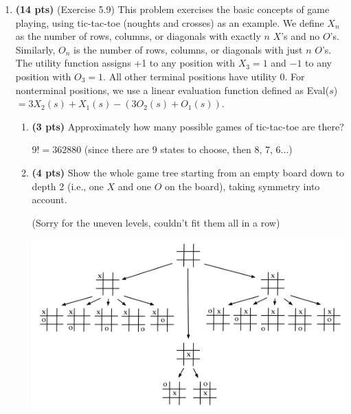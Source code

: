 \documentclass{article}
\begin{document}
\begin{enumerate}
\item \textbf{(14 pts)} (Exercise 5.9) This problem exercises the basic concepts of game playing, using tic-tac-toe (noughts and crosses) as an example. We define $X_n$ as the number of rows, columns, or diagonals with exactly $n$ $X$’s and no $O$’s. Similarly, $O_n$ is the number of rows, columns, or diagonals with just $n$ $O$’s. The utility function assigns +1 to any position with $X_3 = 1$ and $-1$ to any position with $O_3 = 1$. All other terminal positions have utility 0. For nonterminal positions, we  use a linear evaluation function defined as Eval($s$) $ = 3X_2(s) + X_1(s) - (3O_2(s) + O_1(s))$.

\begin{enumerate}[label=($\alph*$)]
    
    
    \item \textbf{(3 pts)} Approximately how many possible games of tic-tac-toe are there?

    \color{blue}
        $9! = 362880$ (since there are 9 states to choose, then 8, 7, 6...)
    \color{black}



    \item \textbf{(4 pts)} Show the whole game tree starting from an empty board down to depth 2 (i.e., one $X$ and one $O$ on the board), taking symmetry into account.

    \color{blue}
        (Sorry for the uneven levels, couldn't fit them all in a row)
    \color{black}

    \includegraphics[scale=0.5]{472-PS4-Q2-B.png}


\end{enumerate}
\end{enumerate}
\end{document}
